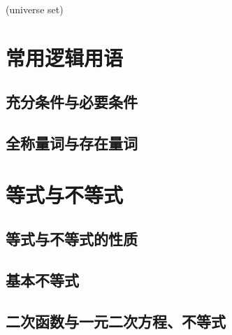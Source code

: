 \documentclass[../main.tex]{subfiles}
\begin{document}
\begin{definition}[全集]\label{def:universe-set}
    (universe set)
\end{definition}

\section{常用逻辑用语}

\subsection{充分条件与必要条件}

\subsection{全称量词与存在量词}

\section{等式与不等式}

\subsection{等式与不等式的性质}

\subsection{基本不等式}

\subsection{二次函数与一元二次方程、不等式}
\end{document}
